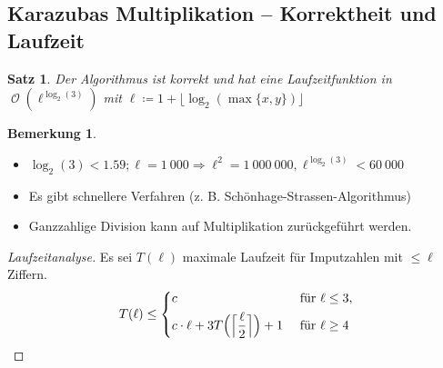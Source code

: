 \documentclass[a4paper,12pt]{article}
\DeclareMathOperator{\BigO}{\mathcal O}
\newtheorem{satz}[axiom]{Satz}
\theoremstyle{definition}
\newtheorem*{bemerkung}{Bemerkung}
\begin{document}
	\subsection{Karazubas Multiplikation -- Korrektheit und Laufzeit}
	\begin{satz}
		Der Algorithmus ist korrekt und hat eine Laufzeitfunktion in $\BigO(\ell^{\log_2(3)})$ mit $\ell \coloneq 1 + \lfloor \log_2(\max\{x,y\})\rfloor$
	\end{satz}
	\begin{bemerkung}
		\begin{itemize}
			\item $\log_2(3) < 1.59; \ell = 1~000 \Longrightarrow \ell^2 = 1~000~000, \ell^{\log_2(3)} < 60~000$
			\item Es gibt schnellere Verfahren (z. B. Schönhage-Strassen-Algorithmus)
			\item Ganzzahlige Division kann auf Multiplikation zurückgeführt werden.
		\end{itemize}
	\end{bemerkung}
	\begin{proof}[Laufzeitanalyse]
		Es sei $T(\ell)$ maximale Laufzeit für Imputzahlen mit $\leq \ell$ Ziffern.
		\[T(\ell) \leq 
		\begin{dcases}
			c & \text{ für } \ell \leq 3,\\
			c \cdot \ell + 3T\Big(\Big\lceil \frac{\ell}{2}\Big\rceil\Big) + 1 & \text{ für } \ell \geq 4
		\end{dcases}
		\]
	\end{proof}
\end{document}

